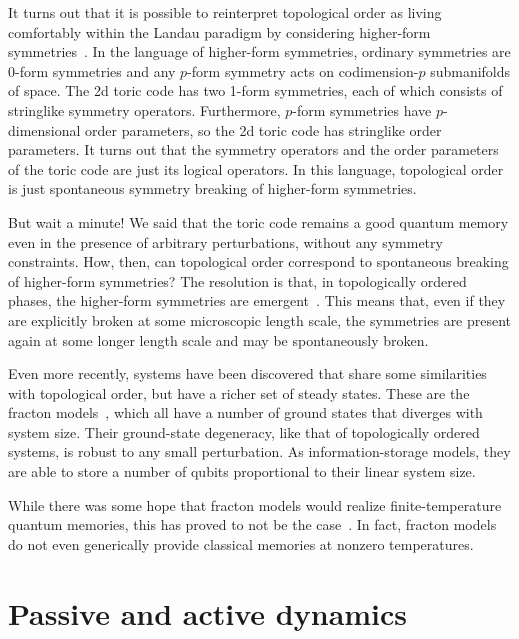 It turns out that it is possible to reinterpret topological order as living comfortably within the Landau paradigm by considering higher-form symmetries~\cite{Nussinov2009Symmetry, Gaiotto2015Generalized, Lake2018Higher, McGreevy2022Generalized, Cordova2022Generalized}. In the language of higher-form symmetries, ordinary symmetries are 0-form symmetries and any $p$-form symmetry acts on codimension-$p$ submanifolds of space. The 2d toric code has two 1-form symmetries, each of which consists of stringlike symmetry operators. Furthermore, $p$-form symmetries have $p$-dimensional order parameters, so the 2d toric code has stringlike order parameters. It turns out that the symmetry operators and the order parameters of the toric code are just its logical operators. In this language, topological order is just spontaneous symmetry breaking of higher-form symmetries.


But wait a minute! We said that the toric code remains a good quantum memory even in the presence of arbitrary perturbations, without any symmetry constraints. How, then, can topological order correspond to spontaneous breaking of higher-form symmetries? The resolution is that, in topologically ordered phases, the higher-form symmetries are emergent~\cite{Wen2019Higher}. This means that, even if they are explicitly broken at some microscopic length scale, the symmetries are present again at some longer length scale and may be spontaneously broken.

Even more recently, systems have been discovered that share some similarities with topological order, but have a richer set of steady states. These are the fracton models~\cite{Chamon2005Glassiness, Bravyi2011Order, Haah2011Code, Vijay2016Fracton,  NandkishoreHermele2019,Pretko2020Fracton}, which all have a number of ground states that diverges with system size. Their ground-state degeneracy, like that of topologically ordered systems, is robust to any small perturbation. As information-storage models, they are able to store a number of qubits proportional to their linear system size.

While there was some hope that fracton models would realize finite-temperature quantum memories, this has proved to not be the case~\cite{PremHaahNandkishore2017, Siva2017Marginally}. In fact, fracton models do not even generically provide classical memories at nonzero temperatures.

\section{Passive and active dynamics}

